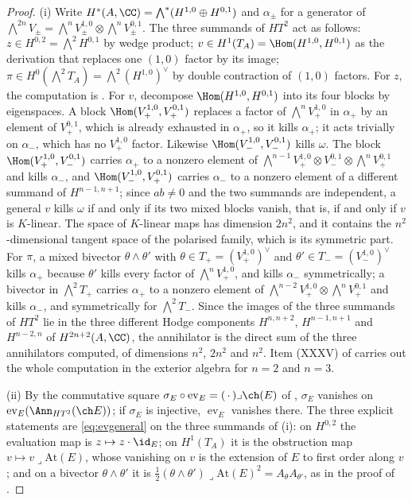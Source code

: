 \begin{proof}
(i) Write $H^{*}(A,\CC)=\bigwedge^{*}(H^{1,0}\oplus H^{0,1})$ and
$\alpha_{\pm}$ for a generator of $\bigwedge^{2n}V_{\pm}
=\bigwedge^{n}V_{\pm}^{1,0}\otimes\bigwedge^{n}V_{\pm}^{0,1}$. The three
summands of $HT^{2}$ act as follows: $z\in H^{0,2}=\bigwedge^{2}H^{0,1}$ by
wedge product; $v\in H^{1}(T_{A})=\Hom(H^{1,0},H^{0,1})$ as the derivation
that replaces one $(1,0)$ factor by its image; $\pi\in H^{0}(\bigwedge^{2}T_{A})
=\bigwedge^{2}(H^{1,0})^{\vee}$ by double contraction of $(1,0)$ factors. For
$z$, the computation is . For $v$, decompose
$\Hom(H^{1,0},H^{0,1})$ into its four blocks by eigenspaces. A block
$\Hom(V_{+}^{1,0},V_{+}^{0,1})$ replaces a factor of $\bigwedge^{n}V_{+}^{1,0}$
in $\alpha_{+}$ by an element of $V_{+}^{0,1}$, which is already exhausted in
$\alpha_{+}$, so it kills $\alpha_{+}$; it acts trivially on $\alpha_{-}$,
which has no $V_{+}^{1,0}$ factor. Likewise $\Hom(V_{-}^{1,0},V_{-}^{0,1})$
kills $\omega$. The block $\Hom(V_{+}^{1,0},V_{-}^{0,1})$ carries $\alpha_{+}$
to a nonzero element of $\bigwedge^{n-1}V_{+}^{1,0}\otimes V_{-}^{0,1}
\otimes\bigwedge^{n}V_{+}^{0,1}$ and kills $\alpha_{-}$, and
$\Hom(V_{-}^{1,0},V_{+}^{0,1})$ carries $\alpha_{-}$ to a nonzero element of
a different summand of $H^{n-1,n+1}$; since $ab\ne0$ and the two summands are
independent, a general $v$ kills $\omega$ if and only if its two mixed blocks
vanish, that is, if and only if $v$ is $K$-linear. The space of $K$-linear
maps has dimension $2n^{2}$, and it contains the $n^{2}$-dimensional tangent
space of the polarised family, which is its symmetric part. For $\pi$, a
mixed bivector $\theta\wedge\theta'$ with $\theta\in T_{+}=(V_{+}^{1,0})^{\vee}$
and $\theta'\in T_{-}=(V_{-}^{1,0})^{\vee}$ kills $\alpha_{+}$ because
$\theta'$ kills every factor of $\bigwedge^{n}V_{+}^{1,0}$, and kills
$\alpha_{-}$ symmetrically; a bivector in $\bigwedge^{2}T_{+}$ carries
$\alpha_{+}$ to a nonzero element of $\bigwedge^{n-2}V_{+}^{1,0}
\otimes\bigwedge^{n}V_{+}^{0,1}$ and kills $\alpha_{-}$, and symmetrically
for $\bigwedge^{2}T_{-}$. Since the images of the three summands of $HT^{2}$
lie in the three different Hodge components $H^{n,n+2}$, $H^{n-1,n+1}$ and
$H^{n-2,n}$ of $H^{2n+2}(A,\CC)$, the annihilator is the direct sum of the
three annihilators computed, of dimensions $n^{2}$, $2n^{2}$ and $n^{2}$. Item
(XXXV) of  carries out the whole computation in the
exterior algebra for $n=2$ and $n=3$.

(ii) By the commutative square $\sigma_{E}\circ\operatorname{ev}_{E}
=(\,\cdot\,)\lrcorner\ch(E)$ of , $\sigma_{E}$
vanishes on $\operatorname{ev}_{E}(\Ann_{HT^{2}}(\ch E))$; if $\sigma_{E}$
is injective, $\operatorname{ev}_{E}$ vanishes there. The three explicit
statements are \eqref{eq:evgeneral} on the three summands of (i): on
$H^{0,2}$ the evaluation map is $z\mapsto z\cdot\id_{E}$; on $H^{1}(T_{A})$
it is the obstruction map $v\mapsto v\lrcorner\mathrm{At}(E)$, whose
vanishing on $v$ is the extension of $E$ to first order along $v$
\cite{Tod09}; and on a bivector $\theta\wedge\theta'$ it is
$\tfrac12(\theta\wedge\theta')\lrcorner\mathrm{At}(E)^{2}
=A_{\theta}A_{\theta'}$, as in the proof of .


\end{proof}
